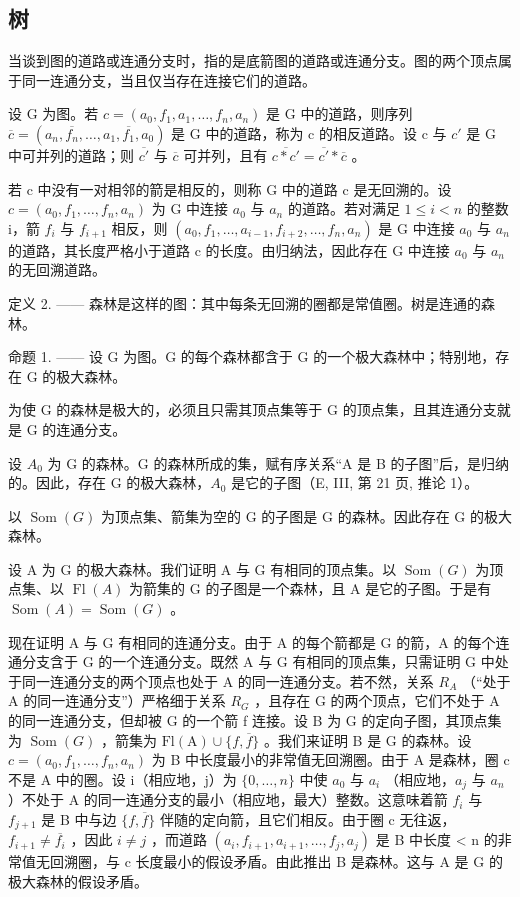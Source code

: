 \subsection{树}

当谈到图的道路或连通分支时，指的是底箭图的道路或连通分支。图的两个顶点属于同一连通分支，当且仅当存在连接它们的道路。

设 G 为图。若 \(c = (a_{0}, f_{1}, a_{1}, \ldots, f_{n}, a_{n})\) 是 G 中的道路，则序列 \(\overline{c} = (a_{n}, \overline{f_{n}}, \ldots, a_{1}, \overline{f_{1}}, a_{0})\) 是 G 中的道路，称为 c 的相反道路。设 c 与 \(c'\) 是 G 中可并列的道路；则 \(\overline{c'}\) 与 \(\overline{c}\) 可并列，且有 \(\overline{c * c'} = \overline{c'} * \overline{c}\) 。

若 c 中没有一对相邻的箭是相反的，则称 G 中的道路 c 是无回溯的。设 \(c = (a_{0}, f_{1}, \ldots, f_{n}, a_{n})\) 为 G 中连接 \(a_{0}\) 与 \(a_{n}\) 的道路。若对满足 \(1 \leqslant i < n\) 的整数 i，箭 \(f_{i}\) 与 \(f_{i+1}\) 相反，则 \((a_{0}, f_{1}, \ldots, a_{i-1}, f_{i+2}, \ldots, f_{n}, a_{n})\) 是 G 中连接 \(a_{0}\) 与 \(a_{n}\) 的道路，其长度严格小于道路 c 的长度。由归纳法，因此存在 G 中连接 \(a_{0}\) 与 \(a_{n}\) 的无回溯道路。

定义 2. —— 森林是这样的图：其中每条无回溯的圈都是常值圈。树是连通的森林。

命题 1. —— 设 G 为图。G 的每个森林都含于 G 的一个极大森林中；特别地，存在 G 的极大森林。

为使 G 的森林是极大的，必须且只需其顶点集等于 G 的顶点集，且其连通分支就是 G 的连通分支。

设 \(A_{0}\) 为 G 的森林。G 的森林所成的集，赋有序关系“A 是 B 的子图”后，是归纳的。因此，存在 G 的极大森林，\(A_{0}\) 是它的子图（E, III, 第 21 页, 推论 1）。

以 \(\operatorname{Som}(G)\) 为顶点集、箭集为空的 G 的子图是 G 的森林。因此存在 G 的极大森林。

设 A 为 G 的极大森林。我们证明 A 与 G 有相同的顶点集。以 \(\operatorname{Som}(G)\) 为顶点集、以 \(\operatorname{Fl}(A)\) 为箭集的 G 的子图是一个森林，且 A 是它的子图。于是有 \(\operatorname{Som}(A) = \operatorname{Som}(G)\) 。

现在证明 A 与 G 有相同的连通分支。由于 A 的每个箭都是 G 的箭，A 的每个连通分支含于 G 的一个连通分支。既然 A 与 G 有相同的顶点集，只需证明 G 中处于同一连通分支的两个顶点也处于 A 的同一连通分支。若不然，关系 \(R_{A}\) （“处于 A 的同一连通分支”）严格细于关系 \(R_{G}\) ，且存在 G 的两个顶点，它们不处于 A 的同一连通分支，但却被 G 的一个箭 f 连接。设 B 为 G 的定向子图，其顶点集为 \(\operatorname{Som}(G)\) ，箭集为 \(\mathrm{Fl(A)} \cup \{f, \overline{f}\}\) 。我们来证明 B 是 G 的森林。设 \(c = (a_{0}, f_{1}, \ldots, f_{n}, a_{n})\) 为 B 中长度最小的非常值无回溯圈。由于 A 是森林，圈 c 不是 A 中的圈。设 i（相应地，j）为 \(\{0, \ldots, n\}\) 中使 \(a_{0}\) 与 \(a_{i}\) （相应地，\(a_{j}\) 与 \(a_{n}\) ）不处于 A 的同一连通分支的最小（相应地，最大）整数。这意味着箭 \(f_{i}\) 与 \(f_{j+1}\) 是 B 中与边 \(\{f, \overline{f}\}\) 伴随的定向箭，且它们相反。由于圈 c 无往返，\(f_{i+1} \neq \overline{f_{i}}\) ，因此 \(i \neq j\) ，而道路 \((a_{i}, f_{i+1}, a_{i+1}, \ldots, f_{j}, a_{j})\) 是 B 中长度 < n 的非常值无回溯圈，与 c 长度最小的假设矛盾。由此推出 B 是森林。这与 A 是 G 的极大森林的假设矛盾。

